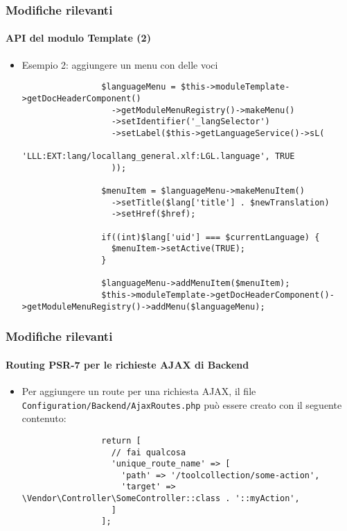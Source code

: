 \begin{frame}[fragile]
	\frametitle{Modifiche rilevanti}
	\framesubtitle{API del modulo Template (2)}

	\lstset{basicstyle=\tiny\ttfamily}

	\begin{itemize}
		\item Esempio 2: aggiungere un menu con delle voci

			\begin{lstlisting}
				$languageMenu = $this->moduleTemplate->getDocHeaderComponent()
				  ->getModuleMenuRegistry()->makeMenu()
				  ->setIdentifier('_langSelector')
				  ->setLabel($this->getLanguageService()->sL(
				    'LLL:EXT:lang/locallang_general.xlf:LGL.language', TRUE
				  ));

				$menuItem = $languageMenu->makeMenuItem()
				  ->setTitle($lang['title'] . $newTranslation)
				  ->setHref($href);

				if((int)$lang['uid'] === $currentLanguage) {
				  $menuItem->setActive(TRUE);
				}

				$languageMenu->addMenuItem($menuItem);
				$this->moduleTemplate->getDocHeaderComponent()->getModuleMenuRegistry()->addMenu($languageMenu);
			\end{lstlisting}
	\end{itemize}

\end{frame}



\begin{frame}[fragile]
	\frametitle{Modifiche rilevanti}
	\framesubtitle{Routing PSR-7 per le richieste AJAX di Backend}

	\lstset{basicstyle=\tiny\ttfamily}

	\begin{itemize}

		\item Per aggiungere un route per una richiesta AJAX, il file
			\texttt{Configuration/Backend/AjaxRoutes.php}\newline
			può essere creato con il seguente contenuto:

			\begin{lstlisting}
				return [
				  // fai qualcosa
				  'unique_route_name' => [
				    'path' => '/toolcollection/some-action',
				    'target' => \Vendor\Controller\SomeController::class . '::myAction',
				  ]
				];
			\end{lstlisting}

	\end{itemize}

\end{frame}

